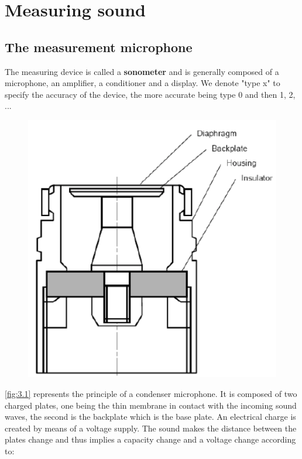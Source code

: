 
\chapter{Measuring sound}
\section{The measurement microphone}
	The measuring device is called a \textbf{sonometer} and is generally composed of a microphone, an amplifier, a conditioner and a display. We denote "type x" to specify the accuracy of the device, the more accurate being type 0 and then 1, 2, ... 
	\begin{figure}
	\vspace{-5mm}
	\includegraphics[scale=0.25]{acoustics/ch3/1}
	\label{fig:3.1}
	\end{figure}
	\autoref{fig:3.1} represents the principle of a condenser microphone. It is composed of two charged plates, one being the thin membrane in contact with the incoming sound waves, the second is the backplate which is the base plate. An electrical charge is created by means of a voltage supply. The sound makes the distance between the plates change and thus implies a capacity change and a voltage change according to:
	
